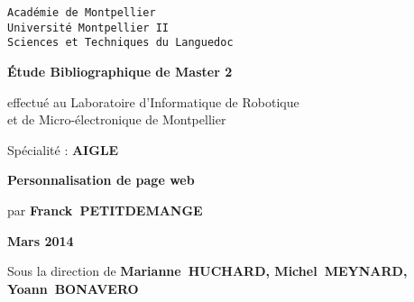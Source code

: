 \documentclass[10pt,a4paper]{article}
\begin{document}
\pagestyle{fancyplain}
\thispagestyle{empty}
\noindent
\begin{center}
\large{\texttt{Académie de Montpellier}}\\
\Large{\texttt{Université Montpellier II}}\\
\large{\texttt{Sciences et Techniques du Languedoc}}\\
\end{center}

\vspace{1cm}

\begin{center}
\Huge{\textbf{Étude Bibliographique de Master 2\\}}
 \vspace{1.0cm}
\normalsize
\begin{center}
\vspace{1.0cm}
effectué au Laboratoire d'Informatique de Robotique\\
et de Micro-électronique de Montpellier
\end{center}

\vspace{2mm}

\vspace{0.1cm}
\normalsize

\vspace{3mm}

\large{Spécialité} : \textbf{AIGLE}\\
\vspace{1.0cm}

\LARGE{\textbf{Personnalisation de page web}}
\vspace{2mm}

\begin{center}
  par \textbf{Franck~PETITDEMANGE}
\end{center}

\vspace{2mm}



\vspace{4cm}

\textbf{Mars 2014}

\vspace{0.5cm}

Sous la direction de \textbf{Marianne~HUCHARD, Michel~MEYNARD, Yoann~BONAVERO}


\end{center}
\end{document}
